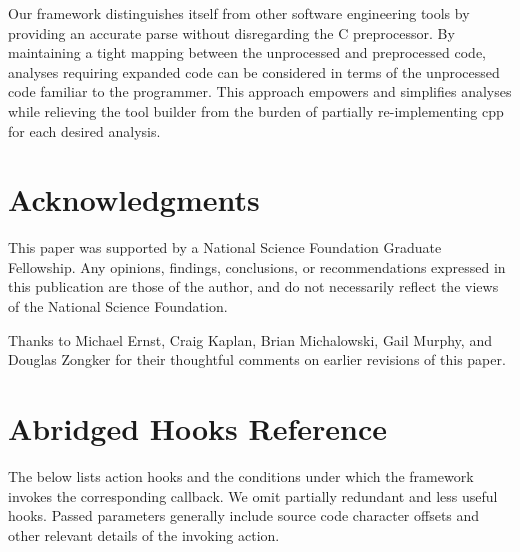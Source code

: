\documentclass{article}
\newcommand{\Cpp}{\mbox{\textsf{cpp}}}
\newcommand{\C}{\mbox{C}}
\begin{document}
Our framework distinguishes itself from other software
engineering tools by providing an accurate parse without disregarding
the \C{} preprocessor.  By maintaining a tight
mapping between the unprocessed and preprocessed code, analyses
requiring expanded code can be considered in terms of the unprocessed
code familiar to the programmer.  This approach empowers and simplifies
analyses while relieving the tool builder from the burden of partially 
re-implementing \Cpp{} for each desired analysis.

\section*{Acknowledgments}
\label{sec:ack}
This paper was supported by a National Science Foundation Graduate
Fellowship. Any opinions, findings, conclusions, or recommendations
expressed in this publication are those of the author, and do not
necessarily reflect the views of the National Science Foundation.

Thanks to Michael Ernst, Craig Kaplan, Brian Michalowski, Gail Murphy, and Douglas
Zongker for their thoughtful comments on earlier revisions of this
paper.

\appendix

\section{Abridged Hooks Reference}
\label{sec:hooks}

The below lists action hooks and the conditions under which the
framework invokes the corresponding callback.  We omit partially
redundant and less useful hooks. Passed parameters
generally include source code character offsets and other relevant
details of the invoking action.
\end{document}
